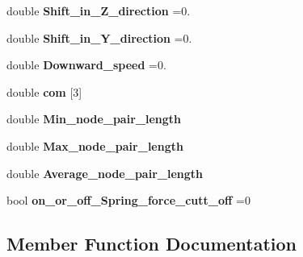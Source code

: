 \begin{DoxyCompactItemize}
\item 
double {\bfseries Shift\+\_\+in\+\_\+\+Z\+\_\+direction} =0.\hypertarget{classMembrane_a2fa88fd7d9832ef58e63b10208a7ccae}{}\label{classMembrane_a2fa88fd7d9832ef58e63b10208a7ccae}

\item 
double {\bfseries Shift\+\_\+in\+\_\+\+Y\+\_\+direction} =0.\hypertarget{classMembrane_a73b22fb2ebda65accee05510303249ae}{}\label{classMembrane_a73b22fb2ebda65accee05510303249ae}

\item 
double {\bfseries Downward\+\_\+speed} =0.\hypertarget{classMembrane_a2dae9292b1e7fb768963ada117f98e2c}{}\label{classMembrane_a2dae9292b1e7fb768963ada117f98e2c}

\item 
double {\bfseries com} \mbox{[}3\mbox{]}\hypertarget{classMembrane_a9908419011350ca5fea46af3f881425c}{}\label{classMembrane_a9908419011350ca5fea46af3f881425c}

\item 
double {\bfseries Min\+\_\+node\+\_\+pair\+\_\+length}\hypertarget{classMembrane_a7abb097e17e7293dc1cf559d66a01111}{}\label{classMembrane_a7abb097e17e7293dc1cf559d66a01111}

\item 
double {\bfseries Max\+\_\+node\+\_\+pair\+\_\+length}\hypertarget{classMembrane_adf55fbfa96375a631b399bd7f6cb1829}{}\label{classMembrane_adf55fbfa96375a631b399bd7f6cb1829}

\item 
double {\bfseries Average\+\_\+node\+\_\+pair\+\_\+length}\hypertarget{classMembrane_ae80a22b9f52cc51918d78269af4a2061}{}\label{classMembrane_ae80a22b9f52cc51918d78269af4a2061}

\item 
bool {\bfseries on\+\_\+or\+\_\+off\+\_\+\+Spring\+\_\+force\+\_\+cutt\+\_\+off} =0\hypertarget{classMembrane_a9bfff9bd03305c8b5cbac2e3d546727b}{}\label{classMembrane_a9bfff9bd03305c8b5cbac2e3d546727b}

\end{DoxyCompactItemize}


\subsection{Member Function Documentation}
